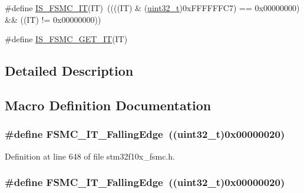 \begin{DoxyCompactItemize}
\item 
\#define \hyperlink{group___f_s_m_c___interrupt__sources_ga40a38f097a75f27a700e626905fa9a38}{I\+S\+\_\+\+F\+S\+M\+C\+\_\+\+IT}(IT)~((((IT) \& (\hyperlink{_p_e___types_8h_a33594304e786b158f3fb30289278f5af}{uint32\+\_\+t})0x\+F\+F\+F\+F\+F\+F\+C7) == 0x00000000) \&\& ((\+I\+T) != 0x00000000))
\item 
\#define \hyperlink{group___f_s_m_c___interrupt__sources_gae2a57d0b15e025212489ec1421ff245d}{I\+S\+\_\+\+F\+S\+M\+C\+\_\+\+G\+E\+T\+\_\+\+IT}(IT)
\end{DoxyCompactItemize}


\subsection{Detailed Description}


\subsection{Macro Definition Documentation}
\subsubsection[{\texorpdfstring{F\+S\+M\+C\+\_\+\+I\+T\+\_\+\+Falling\+Edge}{FSMC_IT_FallingEdge}}]{\setlength{\rightskip}{0pt plus 5cm}\#define F\+S\+M\+C\+\_\+\+I\+T\+\_\+\+Falling\+Edge~(({\bf uint32\+\_\+t})0x00000020)}\hypertarget{group___f_s_m_c___interrupt__sources_ga8e4b9589c9981c900b5f2e84581a9693}{}\label{group___f_s_m_c___interrupt__sources_ga8e4b9589c9981c900b5f2e84581a9693}


Definition at line 648 of file stm32f10x\+\_\+fsmc.\+h.

\subsubsection[{\texorpdfstring{F\+S\+M\+C\+\_\+\+I\+T\+\_\+\+Falling\+Edge}{FSMC_IT_FallingEdge}}]{\setlength{\rightskip}{0pt plus 5cm}\#define F\+S\+M\+C\+\_\+\+I\+T\+\_\+\+Falling\+Edge~(({\bf uint32\+\_\+t})0x00000020)}\hypertarget{group___f_s_m_c___interrupt__sources_ga8e4b9589c9981c900b5f2e84581a9693}{}\label{group___f_s_m_c___interrupt__sources_ga8e4b9589c9981c900b5f2e84581a9693}


